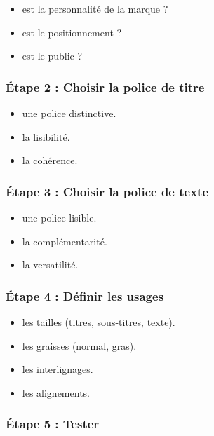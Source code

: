 \begin{itemize}
    \item {} est la personnalité de la marque ?
    \item {} est le positionnement ?
    \item {} est le public ?
\end{itemize}

\subsubsection{Étape 2 : Choisir la police de titre}

\begin{itemize}
    \item {} une police distinctive.
    \item {} la lisibilité.
    \item {} la cohérence.
\end{itemize}

\subsubsection{Étape 3 : Choisir la police de texte}

\begin{itemize}
    \item {} une police lisible.
    \item {} la complémentarité.
    \item {} la versatilité.
\end{itemize}

\subsubsection{Étape 4 : Définir les usages}

\begin{itemize}
    \item {} les tailles (titres, sous-titres, texte).
    \item {} les graisses (normal, gras).
    \item {} les interlignages.
    \item {} les alignements.
\end{itemize}

\subsubsection{Étape 5 : Tester}

